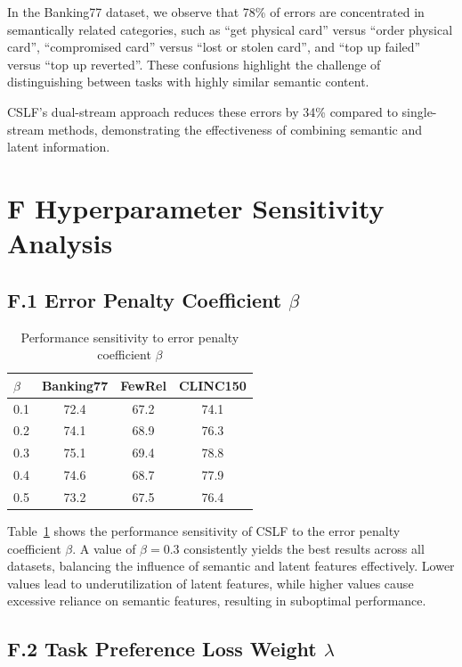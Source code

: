 \documentclass[11pt]{article}
\begin{document}
In the Banking77 dataset, we observe that 78\% of errors are concentrated in semantically related categories, such as ``get physical card'' versus ``order physical card'', ``compromised card'' versus ``lost or stolen card'', and ``top up failed'' versus ``top up reverted''. These confusions highlight the challenge of distinguishing between tasks with highly similar semantic content.

CSLF's dual-stream approach reduces these errors by 34\% compared to single-stream methods, demonstrating the effectiveness of combining semantic and latent information.

\section*{F  Hyperparameter Sensitivity Analysis}

\subsection*{F.1 Error Penalty Coefficient $\beta$}

\begin{table}[t]
\centering
\begin{tabular}{lccc}
\toprule
$\beta$ & Banking77 & FewRel & CLINC150 \\
\midrule
0.1 & 72.4 & 67.2 & 74.1 \\
0.2 & 74.1 & 68.9 & 76.3 \\
0.3 & 75.1 & 69.4 & 78.8 \\
0.4 & 74.6 & 68.7 & 77.9 \\
0.5 & 73.2 & 67.5 & 76.4 \\
\bottomrule
\end{tabular}
\caption{Performance sensitivity to error penalty coefficient $\beta$}
\label{tab:beta-sensitivity}
\end{table}

Table~\ref{tab:beta-sensitivity} shows the performance sensitivity of CSLF to the error penalty coefficient $\beta$. A value of $\beta = 0.3$ consistently yields the best results across all datasets, balancing the influence of semantic and latent features effectively. Lower values lead to underutilization of latent features, while higher values cause excessive reliance on semantic features, resulting in suboptimal performance.




\subsection*{F.2 Task Preference Loss Weight $\lambda$}
\end{document}
